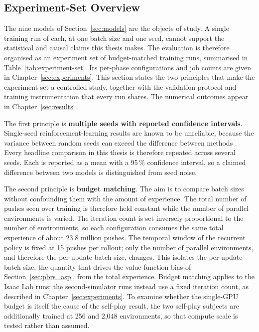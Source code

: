 \subsection{Experiment-Set Overview}
\label{sec:experiment-set}

The nine models of Section~\ref{sec:models} are the objects of study. A single
training run of each, at one batch size and one seed, cannot support the
statistical and causal claims this thesis makes. The evaluation is therefore
organised as an experiment set of budget-matched training runs, summarised in
Table~\ref{tab:experiment-set}. Its per-phase configurations and job counts are
given in Chapter~\ref{sec:experiments}. This section states the two principles
that make the experiment set a controlled study, together with the validation
protocol and training instrumentation that every run shares. The numerical
outcomes appear in Chapter~\ref{sec:results}.

\FloatBarrier

The first principle is \textbf{multiple seeds with reported confidence intervals}.
Single-seed reinforcement-learning results are known to be unreliable, because the
variance between random seeds can exceed the difference between methods
\cite{Henderson2018DeepRLMatters, Agarwal2021StatisticalPrecipice}. Every headline
comparison in this thesis is therefore repeated across several seeds. Each is
reported as a mean with a 95\,\% confidence interval, so a claimed difference
between two models is distinguished from seed noise.

The second principle is \textbf{budget matching}. The aim is to compare batch
sizes without confounding them with the amount of experience. The total number of
pushes seen over training is therefore held constant while the number of parallel
environments is varied. The iteration count is set inversely proportional to the
number of environments, so each configuration consumes the same total experience
of about 23.8 million pushes. The temporal window of the recurrent policy is fixed
at 15 pushes per rollout; only the number of parallel environments, and therefore
the per-update batch size, changes. This isolates the per-update batch size, the
quantity that drives the value-function bias of Section~\ref{sec:pbrs_asp}, from
the total experience. Budget matching applies to the Isaac Lab runs; the
second-simulator runs instead use a fixed iteration count, as described in
Chapter~\ref{sec:experiments}. To examine whether the single-GPU budget is itself
the cause of the self-play result, the two self-play subjects are additionally
trained at 256 and 2{,}048 environments, so that compute scale is tested rather
than assumed.

